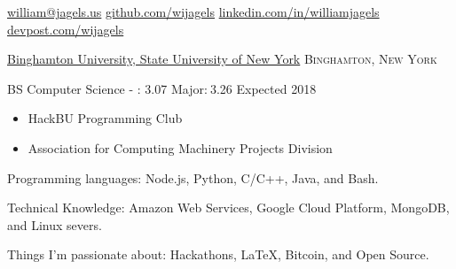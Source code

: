 \documentclass[11pt]{article}
\begin{document}


\nobreakvspace{0.3em}  %

\noindent\href{mailto:william@jagels.us}{william@jagels.us}\sbull
\href{https://github.com/wijagels}{github.com/wijagels}\sbull
\href{https://www.linkedin.com/in/williamjagels}{linkedin.com/in/williamjagels}\sbull
\href{http://devpost.com/wijagels}{devpost.com/wijagels}



\spacedhrule{0.1em}{0.9em}  %

\headedsection
{\href{http://www.binghamton.edu/index.php}{Binghamton University, State University of New York}}
{\textsc{Binghamton, New York}} {
    \headedsubsection
    {BS Computer Science - : 3.07\kern 5pt Major:$\:$3.26}
    {Expected 2018}
    {
        \begin{itemize}
            \item HackBU Programming Club
            \item Association for Computing Machinery Projects Division
        \end{itemize}
    }
}



\spacedhrule{0.1em}{0.9em}  %

\inlineheadsection  %
{Programming languages:}
{ Node.js, Python, C/C++, Java, and Bash.}


\inlineheadsection
{Technical Knowledge:}
{ Amazon Web Services, Google Cloud Platform, MongoDB, and Linux severs. }

\inlineheadsection
{Things I'm passionate about:}
{Hackathons, \LaTeX, Bitcoin, and Open Source.}




\spacedhrule{0.1em}{0.9em}  %
\end{document}
